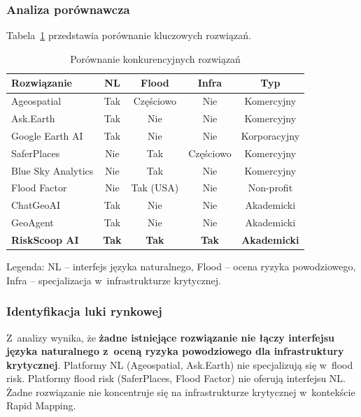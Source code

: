 \subsubsection{Analiza porównawcza}

Tabela~\ref{tab:competitive-comparison} przedstawia porównanie kluczowych rozwiązań.

\begin{table}[H]
\centering
\caption{Porównanie konkurencyjnych rozwiązań}
\label{tab:competitive-comparison}
\begin{tabular}{|l|c|c|c|c|}
\hline
\textbf{Rozwiązanie} & \textbf{NL} & \textbf{Flood} & \textbf{Infra} & \textbf{Typ} \\
\hline
Ageospatial & Tak & Częściowo & Nie & Komercyjny \\
\hline
Ask.Earth & Tak & Nie & Nie & Komercyjny \\
\hline
Google Earth AI & Tak & Nie & Nie & Korporacyjny \\
\hline
SaferPlaces & Nie & Tak & Częściowo & Komercyjny \\
\hline
Blue Sky Analytics & Nie & Tak & Nie & Komercyjny \\
\hline
Flood Factor & Nie & Tak (USA) & Nie & Non-profit \\
\hline
ChatGeoAI & Tak & Nie & Nie & Akademicki \\
\hline
GeoAgent & Tak & Nie & Nie & Akademicki \\
\hline
\textbf{RiskScoop AI} & \textbf{Tak} & \textbf{Tak} & \textbf{Tak} & \textbf{Akademicki} \\
\hline
\end{tabular}
\end{table}

Legenda: NL -- interfejs języka naturalnego, Flood -- ocena ryzyka powodziowego, Infra -- specjalizacja w~infrastrukturze krytycznej.

\subsubsection{Identyfikacja luki rynkowej}

Z~analizy wynika, że \textbf{żadne istniejące rozwiązanie nie łączy interfejsu języka naturalnego z~oceną ryzyka powodziowego dla infrastruktury krytycznej}. Platformy NL (Ageospatial, Ask.Earth) nie specjalizują się w~flood risk. Platformy flood risk (SaferPlaces, Flood Factor) nie oferują interfejsu NL. Żadne rozwiązanie nie koncentruje się na infrastrukturze krytycznej w~kontekście Rapid Mapping.

